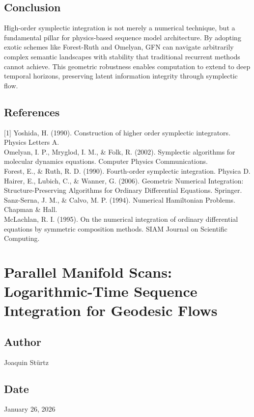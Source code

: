 \documentclass{article}
\numberwithin{equation}{section}
\begin{document}
\subsection{Conclusion}
High-order symplectic integration is not merely a numerical technique, but a fundamental pillar for physics-based sequence model architecture. By adopting exotic schemes like Forest-Ruth and Omelyan, GFN can navigate arbitrarily complex semantic landscapes with stability that traditional recurrent methods cannot achieve. This geometric robustness enables computation to extend to deep temporal horizons, preserving latent information integrity through symplectic flow.

\subsection*{References}
[1] Yoshida, H. (1990). Construction of higher order symplectic integrators. Physics Letters A.\\
[2] Omelyan, I. P., Mryglod, I. M., \& Folk, R. (2002). Symplectic algorithms for molecular dynamics equations. Computer Physics Communications.\\
[3] Forest, E., \& Ruth, R. D. (1990). Fourth-order symplectic integration. Physica D.\\
[4] Hairer, E., Lubich, C., \& Wanner, G. (2006). Geometric Numerical Integration: Structure-Preserving Algorithms for Ordinary Differential Equations. Springer.\\
[5] Sanz-Serna, J. M., \& Calvo, M. P. (1994). Numerical Hamiltonian Problems. Chapman \& Hall.\\
[6] McLachlan, R. I. (1995). On the numerical integration of ordinary differential equations by symmetric composition methods. SIAM Journal on Scientific Computing.

\section{Parallel Manifold Scans: Logarithmic-Time Sequence Integration for Geodesic Flows}
\subsection*{Author}
Joaquin Stürtz
\subsection*{Date}
January 26, 2026
\end{document}
